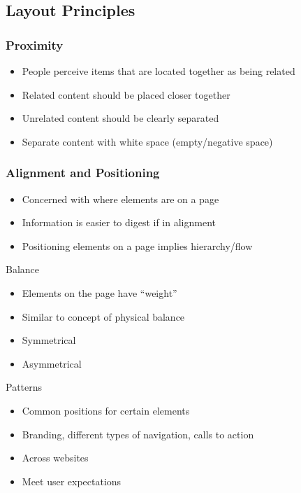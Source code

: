 \subsection{Layout Principles}
\subsubsection{Proximity}
\begin{itemize}
	\item People perceive items that are located together as being related
	\item Related content should be placed closer together
	\item Unrelated content should be clearly separated
	\item Separate content with white space (empty/negative space)	
\end{itemize}

\subsubsection{Alignment and Positioning}
\begin{itemize}
	\item Concerned with where elements are on a page
	\item Information is easier to digest if in alignment
	\item Positioning elements on a page implies hierarchy/flow	
\end{itemize}

\begin{note}{Balance}
	\begin{itemize}
		\item Elements on the page have ``weight''
		\item Similar to concept of physical balance
		\item Symmetrical
		\item Asymmetrical	
	\end{itemize}
\end{note}

\begin{note}{Patterns}
	\begin{itemize}
		\item Common positions for certain elements
		\item Branding, different types of navigation, calls to action
		\item Across websites
		\item Meet user expectations	
	\end{itemize}
\end{note}

